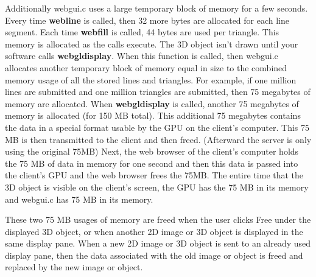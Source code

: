 Additionally webgui.c uses a large temporary block of memory for a few seconds. Every time \textbf{webline} is called,
then 32 more bytes are allocated for each line segment. Each time \textbf{webfill} is called, 44 bytes are used per triangle. 
This memory is allocated as the calls execute. The 3D
object isn't drawn until your software calls \textbf{webgldisplay}. When this function is called, then webgui.c allocates another temporary
block of memory equal in size to the combined memory usage of all the stored lines and triangles. For example, if one million lines
are submitted and one million triangles are submitted, then 75 megabytes of memory are allocated. When \textbf{webgldisplay} is called,
another 75 megabytes of memory is allocated (for 150 MB total). This additional 75 megabytes contains the data in a special format usable
by the GPU on the client's computer. This 75 MB is then transmitted to the client and then freed. (Afterward the server is only
using the original 75MB) Next, the web browser of the client's computer holds the 75 MB of data in memory for one second and then this 
data is passed into the client's GPU and the web browser frees the 75MB. The entire time
that the 3D object is visible on the client's screen, the GPU has the 75 MB in its memory and webgui.c has 75 MB in its memory.

These two 75 MB usages of memory are freed when the user clicks Free under the displayed 3D object, or when another 2D image or 3D object
is displayed in the same display pane. When a new 2D image or 3D object is sent to an already used display pane, then the data 
associated with the old image or object is freed and replaced by the new image or object.
